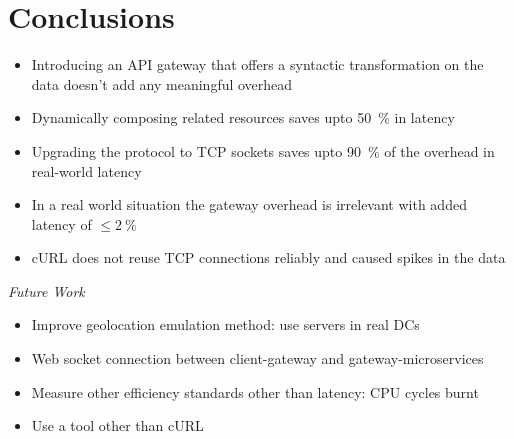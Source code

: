 \section{Conclusions}

\begin{frame}
    \begin{itemize}
        \item Introducing an API gateway that offers a syntactic transformation on the data doesn't add any meaningful overhead
        \item Dynamically composing related resources saves upto \SI{50}{\percent} in latency
        \item Upgrading the protocol to TCP sockets saves upto \SI{90}{\percent} of the overhead in real-world latency
        \item In a real world situation the gateway overhead is irrelevant with added latency of $\leq \SI{2}{\percent}$
        \item cURL does not reuse TCP connections reliably and caused spikes in the data
    \end{itemize}

    \emph{Future Work}
    \begin{itemize}
        \item Improve geolocation emulation method: use servers in real DCs
        \item Web socket connection between client-gateway and gateway-microservices
        \item Measure other efficiency standards other than latency: CPU cycles burnt
        \item Use a tool other than cURL
    \end{itemize}
\end{frame}